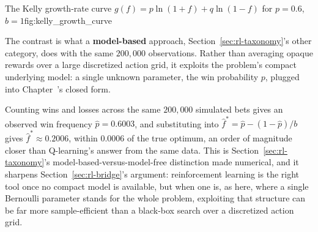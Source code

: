 \documentclass[../ai_in_finance]{subfiles}
\begin{document}
\begin{bookfigure}[htbp]{The Kelly growth-rate curve $g(f)=p\ln(1+f)+q\ln(1-f)$ for $p=0.6$, $b=1$}{fig:kelly_growth_curve}
\end{bookfigure}

The contrast is what a \textbf{model-based} approach, Section~\ref{sec:rl-taxonomy}'s other category, does with the same $200{,}000$ observations. Rather than averaging opaque rewards over a large discretized action grid, it exploits the problem's compact underlying model: a single unknown parameter, the win probability $p$, plugged into Chapter~'s closed form.

Counting wins and losses across the same $200{,}000$ simulated bets gives an observed win frequency $\hat p=0.6003$, and substituting into $\hat f^*=\hat p-(1-\hat p)/b$ gives $\hat f^*\approx0.2006$, within $0.0006$ of the true optimum, an order of magnitude closer than Q-learning's answer from the same data. This is Section~\ref{sec:rl-taxonomy}'s model-based-versus-model-free distinction made numerical, and it sharpens Section~\ref{sec:rl-bridge}'s argument: reinforcement learning is the right tool once no compact model is available, but when one is, as here, where a single Bernoulli parameter stands for the whole problem, exploiting that structure can be far more sample-efficient than a black-box search over a discretized action grid.
\end{document}
